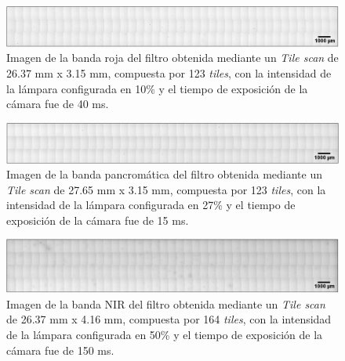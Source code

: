 \begin{figure}[H]
	\centering
	\includegraphics[width=1.0\textwidth]{Figs/cuantificaciondefectos/banda_PANC.png}
	\caption{Imagen de la banda roja del filtro obtenida mediante un \textit{Tile scan} de 26.37 mm x 3.15 mm, compuesta por 123 \textit{tiles}, con la intensidad de la lámpara configurada en 10\% y el tiempo de exposición de la cámara fue de 40 ms.}
	\label{fig:tilebandapanc}
\end{figure}
\begin{figure}[H]
	\centering
	\includegraphics[width=1.0\textwidth]{Figs/defectosZEISS/tilebandaroja.png}
	\caption{Imagen de la banda pancromática del filtro obtenida mediante un \textit{Tile scan} de 27.65 mm x 3.15 mm, compuesta por 123 \textit{tiles}, con la intensidad de la lámpara configurada en 27\% y el tiempo de exposición de la cámara fue de 15 ms.}
	\label{fig:tilebandaroja}
\end{figure}

\begin{figure}[H]
	\centering
	\includegraphics[width=1.0\textwidth]{Figs/cuantificaciondefectos/banda_NIR.png}
	\caption{Imagen de la banda NIR del filtro obtenida mediante un \textit{Tile scan} de 26.37 mm x 4.16 mm, compuesta por 164 \textit{tiles}, con la intensidad de la lámpara configurada en 50\% y el tiempo de exposición de la cámara fue de 150 ms.}
	\label{fig:tilebandanir}
\end{figure}

